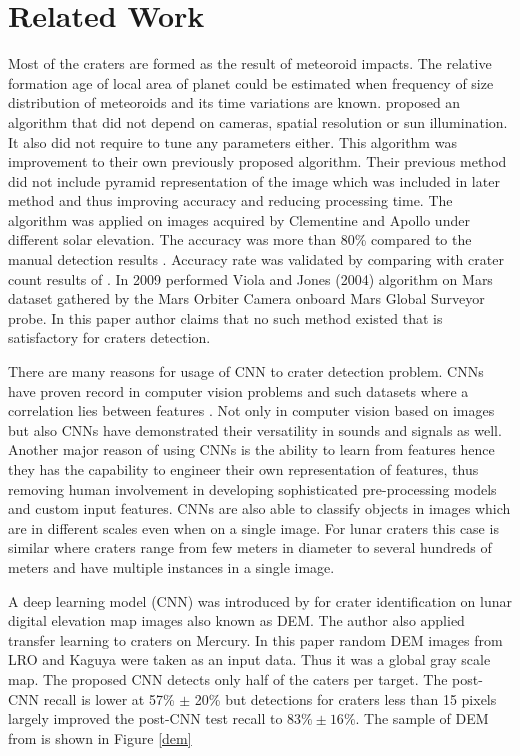 \documentclass[11pt]{article}
\begin{document}
\section{Related Work}
Most of the craters are formed as the result of meteoroid impacts. The relative formation age of local area of planet could be estimated when frequency of size distribution of meteoroids and its time variations are known. \cite{sawabe_2006} proposed an algorithm that did not depend on cameras, spatial resolution or sun illumination. It also did not require to tune any parameters either. This algorithm was improvement to their own previously proposed algorithm. Their previous method did not include pyramid representation of the image which was included in later method and thus improving accuracy and reducing processing time. The algorithm was applied on images acquired by Clementine and Apollo under different solar elevation. The accuracy was more than 80\% compared to the manual detection results \cite{sawabe_2006}. Accuracy rate was validated by comparing with crater count results of \cite{neukum1975cratering}. In 2009 \cite{martins2009crater} performed Viola and Jones (2004) algorithm on Mars dataset gathered by the Mars Orbiter Camera onboard Mars Global Surveyor probe. In this paper author claims that no such method existed that is satisfactory for craters detection.

There are many reasons for usage of CNN to crater detection problem. CNNs have proven record in computer vision problems and such datasets where a correlation lies between features \cite{long2015fully}. Not only in computer vision based on images but also CNNs have demonstrated their versatility in sounds and signals as well. Another major reason of using CNNs is the ability to learn from features hence they has the capability to engineer their own representation of features, thus removing human involvement in developing sophisticated pre-processing models and custom input features. CNNs are also able to classify objects in images which are in different scales even when on a single image. For lunar craters this case is similar where craters range from few meters in diameter to several hundreds of meters and have multiple instances in a single image.

A deep learning model (CNN) was introduced by \cite{silburt2019lunar} for crater identification on lunar digital elevation map images also known as DEM. The author also applied transfer learning to craters on Mercury. In this paper random DEM images from LRO and Kaguya were taken as an input data. Thus it was a global gray scale map. The proposed CNN detects only half of the caters per target. The post-CNN recall is lower at 57\% $\pm$ 20\% but detections for craters less than 15 pixels largely improved the post-CNN test recall to $83 \% \pm 16 \%$. The sample of DEM from \cite{silburt2019lunar} is shown in Figure \ref{dem}
\end{document}
